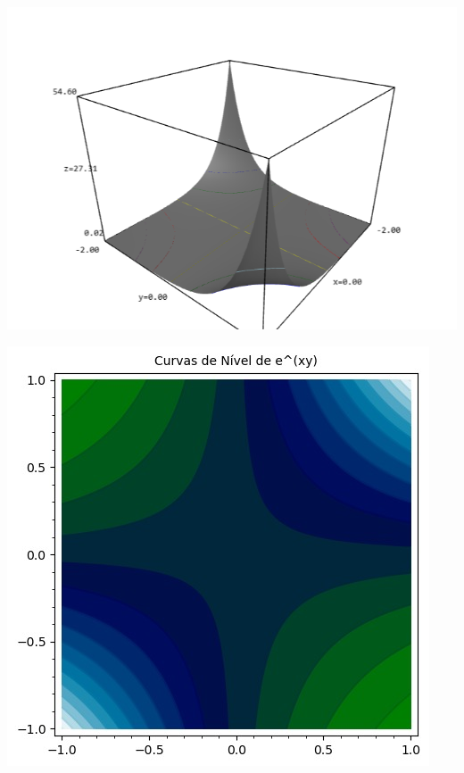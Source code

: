 \documentclass[../main.tex]{subfiles}
\begin{document}
\begin{solucao}
			\begin{center}
				\begin{minipage}{0.45\textwidth}
					\centering
					\includegraphics[width=\textwidth]{imagens/lista03/picture_lista03_q01_item02.png}
				\end{minipage}
				\hfill
				\begin{minipage}{0.45\textwidth}
					\centering
					\includegraphics[width=\textwidth]{imagens/lista03/picture_lista03_q01_item02_02.jpg}
				\end{minipage}
			\end{center}
			

\end{solucao}
\end{document}
